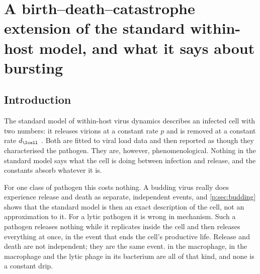 %

\chapter[Burst-aware within-host dynamics]{A birth--death--catastrophe
extension of the standard within-host model, and what it says about
bursting}
\label{p:ch:one-cell-to-population}

\section{Introduction}
\label{p:sec:introduction}

The standard model of within-host virus dynamics describes an infected cell
with two numbers: it releases virions at a constant rate $p$ and is removed
at a constant rate $d_{\Icell}$
\cite{mclean1993balance,nowak1996population,perelson1996hiv}. Both are
fitted to viral load data and then reported as though they characterised the
pathogen. They are, however, phenomenological. Nothing in the standard model
says what the cell is doing between infection and release, and the constants
absorb whatever it is.

For one class of pathogen this costs nothing. A budding virus really does
experience release and death as separate, independent events, and
\cref{p:sec:budding} shows that the standard model is then an exact
description of the cell, not an approximation to it. For a lytic pathogen it
is wrong in mechanism. Such a pathogen releases nothing while it replicates
inside the cell and then releases everything at once, in the event that ends
the cell's productive life. Release and death are not independent; they are
the same event. \yp{} in the macrophage, \ft{} in the macrophage and the
lytic phage in its bacterium are all of that kind, and none is a constant
drip.

